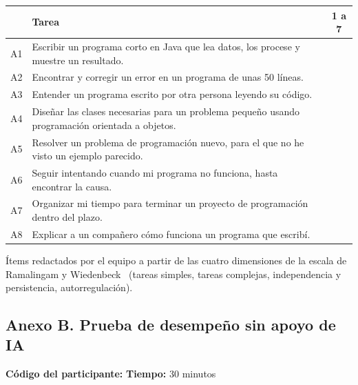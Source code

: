 \documentclass[12pt,letterpaper]{article}
\numberwithin{table}{section}
\numberwithin{figure}{section}
\begin{document}
\begin{center}
\footnotesize
\begin{tabular}{@{}p{0.9cm}p{9.8cm}c@{}}
\toprule
 & \textbf{Tarea} & \textbf{1 a 7} \\
\midrule
A1 & Escribir un programa corto en Java que lea datos, los procese y muestre un resultado. & \underline{\hspace{1.2cm}} \\
A2 & Encontrar y corregir un error en un programa de unas 50 líneas. & \underline{\hspace{1.2cm}} \\
A3 & Entender un programa escrito por otra persona leyendo su código. & \underline{\hspace{1.2cm}} \\
A4 & Diseñar las clases necesarias para un problema pequeño usando programación orientada a objetos. & \underline{\hspace{1.2cm}} \\
A5 & Resolver un problema de programación nuevo, para el que no he visto un ejemplo parecido. & \underline{\hspace{1.2cm}} \\
A6 & Seguir intentando cuando mi programa no funciona, hasta encontrar la causa. & \underline{\hspace{1.2cm}} \\
A7 & Organizar mi tiempo para terminar un proyecto de programación dentro del plazo. & \underline{\hspace{1.2cm}} \\
A8 & Explicar a un compañero cómo funciona un programa que escribí. & \underline{\hspace{1.2cm}} \\
\bottomrule
\end{tabular}
\end{center}
{\footnotesize Ítems redactados por el equipo a partir de las cuatro dimensiones de la escala de Ramalingam y Wiedenbeck~\cite{ramalingam1998development} (tareas simples, tareas complejas, independencia y persistencia, autorregulación).}

\newpage
\subsection*{Anexo B. Prueba de desempeño sin apoyo de IA}

\textbf{Código del participante:} \underline{\hspace{3cm}} \hfill \textbf{Tiempo:} 30 minutos
\end{document}
